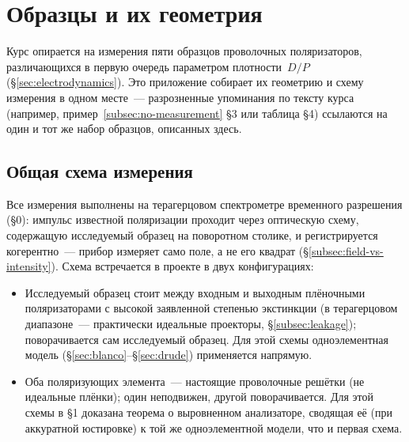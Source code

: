 %
\section{Образцы и их геометрия}
\label{sec:samples}

Курс опирается на измерения пяти образцов проволочных поляризаторов, различающихся в первую
очередь параметром плотности~$D/P$ (§\ref{sec:electrodynamics}). Это приложение собирает их
геометрию и схему измерения в одном месте~--- разрозненные упоминания по тексту курса (например,
пример~\ref{subsec:no-measurement} §3 или таблица §4) ссылаются на один и тот же набор образцов,
описанных здесь.

\subsection*{Общая схема измерения}

Все измерения выполнены на терагерцовом спектрометре временного разрешения (§0): импульс
известной поляризации проходит через оптическую схему, содержащую исследуемый образец на
поворотном столике, и регистрируется когерентно~--- прибор измеряет само поле, а не его квадрат
(§\ref{subsec:field-vs-intensity}). Схема встречается в проекте в двух конфигурациях:

\begin{itemize}[leftmargin=1.6em,itemsep=0.3em]
  \item {} Исследуемый образец
        стоит между входным и выходным плёночными поляризаторами с высокой заявленной степенью
        экстинкции (в терагерцовом диапазоне~--- практически идеальные проекторы,
        §\ref{subsec:leakage}); поворачивается сам исследуемый образец. Для этой схемы
        одноэлементная модель (§\ref{sec:blanco}--§\ref{sec:drude}) применяется напрямую.
  \item {} Оба поляризующих элемента~--- настоящие проволочные
        решётки (не идеальные плёнки); один неподвижен, другой поворачивается. Для этой схемы в
        §1 доказана теорема о выровненном анализаторе, сводящая её (при аккуратной юстировке) к
        той же одноэлементной модели, что и первая схема.
\end{itemize}

